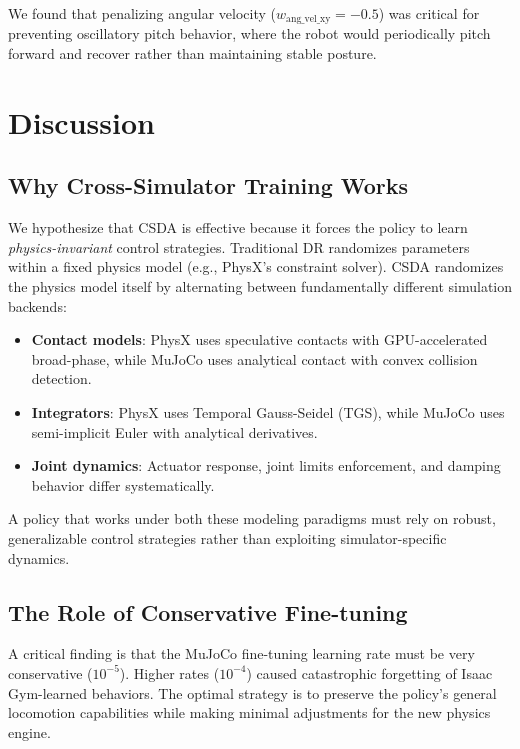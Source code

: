 \documentclass[conference]{IEEEtran}
\begin{document}
We found that penalizing angular velocity ($w_{\text{ang\_vel\_xy}} = -0.5$) was critical for preventing oscillatory pitch behavior, where the robot would periodically pitch forward and recover rather than maintaining stable posture.

\section{Discussion}

\subsection{Why Cross-Simulator Training Works}

We hypothesize that CSDA is effective because it forces the policy to learn \textit{physics-invariant} control strategies. Traditional DR randomizes parameters within a fixed physics model (e.g., PhysX's constraint solver). CSDA randomizes the physics model itself by alternating between fundamentally different simulation backends:

\begin{itemize}
    \item \textbf{Contact models}: PhysX uses speculative contacts with GPU-accelerated broad-phase, while MuJoCo uses analytical contact with convex collision detection.
    \item \textbf{Integrators}: PhysX uses Temporal Gauss-Seidel (TGS), while MuJoCo uses semi-implicit Euler with analytical derivatives.
    \item \textbf{Joint dynamics}: Actuator response, joint limits enforcement, and damping behavior differ systematically.
\end{itemize}

A policy that works under both these modeling paradigms must rely on robust, generalizable control strategies rather than exploiting simulator-specific dynamics.

\subsection{The Role of Conservative Fine-tuning}

A critical finding is that the MuJoCo fine-tuning learning rate must be very conservative ($10^{-5}$). Higher rates ($10^{-4}$) caused catastrophic forgetting of Isaac Gym-learned behaviors. The optimal strategy is to preserve the policy's general locomotion capabilities while making minimal adjustments for the new physics engine.
\end{document}
